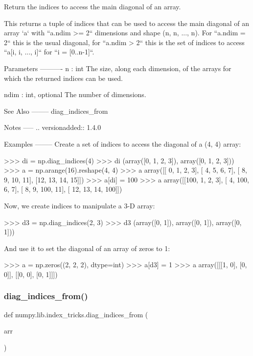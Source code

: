 \begin{DoxyVerb}Return the indices to access the main diagonal of an array.

This returns a tuple of indices that can be used to access the main
diagonal of an array `a` with ``a.ndim >= 2`` dimensions and shape
(n, n, ..., n). For ``a.ndim = 2`` this is the usual diagonal, for
``a.ndim > 2`` this is the set of indices to access ``a[i, i, ..., i]``
for ``i = [0..n-1]``.

Parameters
----------
n : int
  The size, along each dimension, of the arrays for which the returned
  indices can be used.

ndim : int, optional
  The number of dimensions.

See Also
--------
diag_indices_from

Notes
-----
.. versionadded:: 1.4.0

Examples
--------
Create a set of indices to access the diagonal of a (4, 4) array:

>>> di = np.diag_indices(4)
>>> di
(array([0, 1, 2, 3]), array([0, 1, 2, 3]))
>>> a = np.arange(16).reshape(4, 4)
>>> a
array([[ 0,  1,  2,  3],
       [ 4,  5,  6,  7],
       [ 8,  9, 10, 11],
       [12, 13, 14, 15]])
>>> a[di] = 100
>>> a
array([[100,   1,   2,   3],
       [  4, 100,   6,   7],
       [  8,   9, 100,  11],
       [ 12,  13,  14, 100]])

Now, we create indices to manipulate a 3-D array:

>>> d3 = np.diag_indices(2, 3)
>>> d3
(array([0, 1]), array([0, 1]), array([0, 1]))

And use it to set the diagonal of an array of zeros to 1:

>>> a = np.zeros((2, 2, 2), dtype=int)
>>> a[d3] = 1
>>> a
array([[[1, 0],
        [0, 0]],
       [[0, 0],
        [0, 1]]])\end{DoxyVerb}
 \mbox{\label{namespacenumpy_1_1lib_1_1index__tricks_a62e2c1605b994480377db680e3707673}} 
\subsubsection{\texorpdfstring{diag\+\_\+indices\+\_\+from()}{diag\_indices\_from()}}
{\footnotesize\ttfamily def numpy.\+lib.\+index\+\_\+tricks.\+diag\+\_\+indices\+\_\+from (\begin{DoxyParamCaption}\item[{}]{arr }\end{DoxyParamCaption})}

